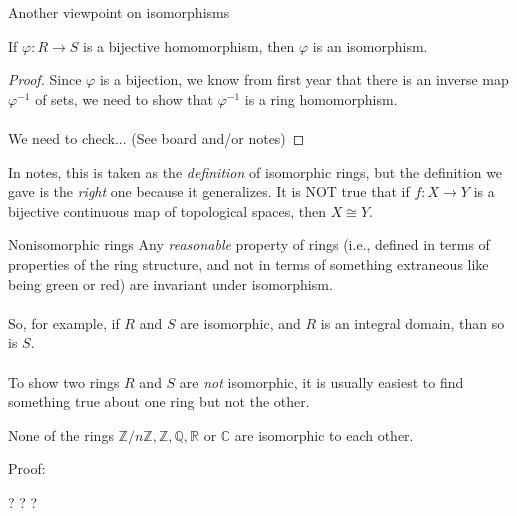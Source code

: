 \documentclass{beamer}
\newcommand{\C}{\mathbb{C}}
\newcommand{\Z}{\mathbb{Z}}
\newcommand{\Q}{\mathbb{Q}}
\newcommand{\R}{\mathbb{R}}
\begin{document}
\begin{frame}{Another viewpoint on isomorphisms}
  \begin{lemma} If $\varphi:R\to S$ is a bijective homomorphism, then $\varphi$ is an isomorphism.
  \end{lemma}

  \begin{proof} Since $\varphi$ is a bijection, we know from first year that there is an inverse map $\varphi^{-1}$ of sets, we need to show that $\varphi^{-1}$ is a ring homomorphism.  \\~\\

    We need to check... (See board and/or notes)\end{proof}

In notes, this is taken as the \emph{definition} of isomorphic rings, but the definition we gave is the \emph{right} one because it generalizes.  It is NOT true that if $f:X\to Y$ is a bijective continuous map of topological spaces, then $X\cong Y$.
  
\end{frame}

\begin{frame}{Nonisomorphic rings}
  Any \emph{reasonable} property of rings (i.e., defined in terms of properties of the ring structure, and not in terms of something extraneous like being {\color{green}green} or {\color{red}red}) are invariant under isomorphism.
\\~\\
So, for example, if $R$ and $S$ are isomorphic, and $R$ is an integral domain, than so is $S$.
\\~\\
To show two rings $R$ and $S$ are \emph{not} isomorphic, it is usually easiest to find something true about one ring but not the other.


\begin{lemma} None of the rings $\Z/n\Z, \Z, \Q,\R$ or $\C$ are isomorphic to each other. \end{lemma}
\begin{block}{Proof:}
  \begin{center} ? ? ? \end{center}
  \end{block}

\end{frame}
\end{document}

